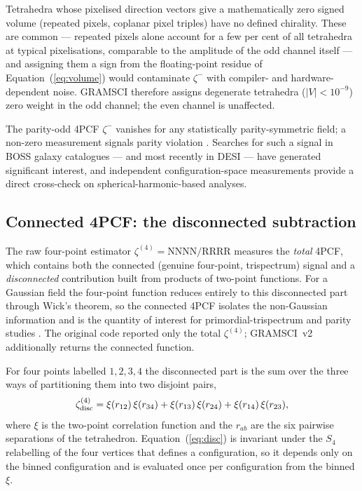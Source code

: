 \documentclass[twocolumn]{aastex701}
\begin{document}
Tetrahedra whose pixelised direction vectors give a mathematically zero
signed volume (repeated pixels, coplanar pixel triples) have no defined
chirality.  These are common --- repeated pixels alone account for a few
per cent of all tetrahedra at typical pixelisations, comparable to the
amplitude of the odd channel itself --- and assigning them a sign from the
floating-point residue of Equation~(\ref{eq:volume}) would contaminate
$\zeta^{-}$ with compiler- and hardware-dependent noise.  GRAMSCI therefore
assigns degenerate tetrahedra ($|V| < 10^{-9}$) zero weight in the odd
channel; the even channel is unaffected.

The parity-odd 4PCF $\zeta^{-}$ vanishes for any statistically
parity-symmetric field; a non-zero measurement signals parity violation
\citep{cahn23}.  Searches for such a signal in BOSS galaxy catalogues
\citep{hou23,philcox22parity} --- and most recently in DESI
\citep{slepian25} --- have generated significant interest, and
independent configuration-space measurements provide a direct cross-check
on spherical-harmonic-based analyses.

\subsection{Connected 4PCF: the disconnected subtraction}
\label{sec:connected}

The raw four-point estimator $\zeta^{(4)} = \mathrm{NNNN}/\mathrm{RRRR}$
measures the \emph{total} 4PCF, which contains both the connected
(genuine four-point, trispectrum) signal and a \emph{disconnected}
contribution built from products of two-point functions.  For a Gaussian
field the four-point function reduces entirely to this disconnected part
through Wick's theorem, so the connected 4PCF isolates the non-Gaussian
information and is the quantity of interest for primordial-trispectrum and
parity studies \citep{sefusatti07}.  The original code \citep{sabiu19}
reported only the total $\zeta^{(4)}$; GRAMSCI~v2 additionally returns the
connected function.

For four points labelled $1,2,3,4$ the disconnected part is the sum over
the three ways of partitioning them into two disjoint pairs,
\begin{equation}
  \zeta^{(4)}_{\rm disc} = \xi(r_{12})\,\xi(r_{34})
                         + \xi(r_{13})\,\xi(r_{24})
                         + \xi(r_{14})\,\xi(r_{23}),
  \label{eq:disc}
\end{equation}
where $\xi$ is the two-point correlation function and the $r_{ab}$ are the
six pairwise separations of the tetrahedron.  Equation~(\ref{eq:disc}) is
invariant under the $S_4$ relabelling of the four vertices that defines a
configuration, so it depends only on the binned configuration and is
evaluated once per configuration from the binned $\xi$.
\end{document}
